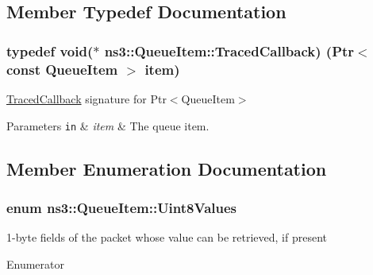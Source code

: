 \subsection{Member Typedef Documentation}
\subsubsection[{\texorpdfstring{Traced\+Callback}{TracedCallback}}]{\setlength{\rightskip}{0pt plus 5cm}typedef void($\ast$  ns3\+::\+Queue\+Item\+::\+Traced\+Callback) ({\bf Ptr}$<$ const {\bf Queue\+Item} $>$ item)}\hypertarget{classns3_1_1QueueItem_ad6d075dd27cd9568655a097e5a83ac44}{}\label{classns3_1_1QueueItem_ad6d075dd27cd9568655a097e5a83ac44}
\hyperlink{classns3_1_1TracedCallback}{Traced\+Callback} signature for Ptr$<$\+Queue\+Item$>$


\begin{DoxyParams}[1]{Parameters}
\mbox{\tt in}  & {\em item} & The queue item. \\
\hline
\end{DoxyParams}


\subsection{Member Enumeration Documentation}
\subsubsection[{\texorpdfstring{Uint8\+Values}{Uint8Values}}]{\setlength{\rightskip}{0pt plus 5cm}enum {\bf ns3\+::\+Queue\+Item\+::\+Uint8\+Values}}\hypertarget{classns3_1_1QueueItem_a9be6c7d46929336179fe00c3224eec9f}{}\label{classns3_1_1QueueItem_a9be6c7d46929336179fe00c3224eec9f}


1-\/byte fields of the packet whose value can be retrieved, if present 

\begin{Desc}
\item[Enumerator]\par
\begin{description}
\item[{\em 
I\+P\+\_\+\+D\+S\+F\+I\+E\+LD\hypertarget{classns3_1_1QueueItem_a9be6c7d46929336179fe00c3224eec9fae5b31413391a0602166106f326465939}{}\label{classns3_1_1QueueItem_a9be6c7d46929336179fe00c3224eec9fae5b31413391a0602166106f326465939}
}]\end{description}
\end{Desc}

